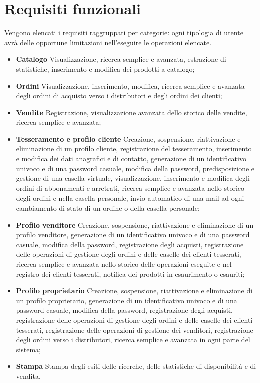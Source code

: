\documentclass[a4paper]{scrartcl}
\begin{document}
\section*{Requisiti funzionali}
Vengono elencati i requisiti raggruppati per categorie: ogni tipologia di utente avrà delle opportune limitazioni nell'eseguire le operazioni elencate.
\begin{itemize}
\item \textbf{Catalogo} Visualizzazione, ricerca semplice e avanzata, estrazione di statistiche, inserimento e modifica dei prodotti a catalogo;
\item \textbf{Ordini} Visualizzazione, inserimento, modifica, ricerca semplice e avanzata degli ordini di acquisto verso i distributori e degli ordini dei clienti;
\item \textbf{Vendite} Registrazione, visualizzazione avanzata dello storico delle vendite, ricerca semplice e avanzata;
\item \textbf{Tesseramento e profilo cliente} Creazione, sospensione, riattivazione e eliminazione di un profilo cliente, registrazione del tesseramento, inserimento e modifica dei dati anagrafici e di contatto, generazione di un identificativo univoco e di una password casuale, modifica della password, predisposizione e gestione di una casella virtuale, visualizzazione, inserimento e modifica degli ordini di abbonamenti e arretrati, ricerca semplice e avanzata nello storico degli ordini e nella casella personale, invio automatico di una mail ad ogni cambiamento di stato di un ordine o della casella personale;
\item \textbf{Profilo venditore} Creazione, sospensione, riattivazione e eliminazione di un profilo venditore, generazione di un identificativo univoco e di una password casuale, modifica della password, registrazione degli acquisti, registrazione delle operazioni di gestione degli ordini e delle caselle dei clienti tesserati, ricerca semplice e avanzata nello storico delle operazioni eseguite e nel registro dei clienti tesserati, notifica dei prodotti in esaurimento o esauriti;
\item \textbf{Profilo proprietario} Creazione, sospensione, riattivazione e eliminazione di un profilo proprietario, generazione di un identificativo univoco e di una password casuale, modifica della password, registrazione degli acquisti, registrazione delle operazioni di gestione degli ordini e delle caselle dei clienti tesserati, registrazione delle operazioni di gestione dei venditori, registrazione degli ordini verso i distributori, ricerca semplice e avanzata in ogni parte del sistema;
\item \textbf{Stampa} Stampa degli esiti delle ricerche, delle statistiche di disponibilità e di vendita.
\end{itemize}
\end{document}
